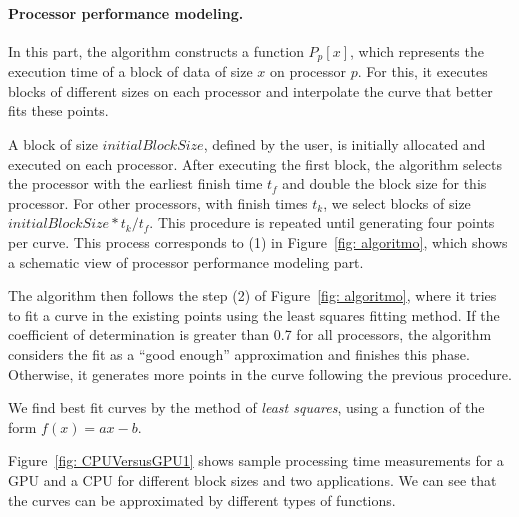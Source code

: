 \documentclass[journal]{IEEEtran}
\begin{document}
\vspace{0.2cm}
\paragraph*{Processor performance modeling.} In this part, the algorithm 
constructs a function $P_p[x]$, which represents the execution time of a block
of data of size $x$ on processor $p$. For this, it executes blocks of different
sizes on each processor and interpolate the curve that better fits these points.

A block of size $initialBlockSize$, defined by the user, is initially allocated
and executed on each processor. After executing the first block, the algorithm
selects the processor with the earliest finish time $t_f$ and double the block
size for this processor. For other processors, with finish times $t_k$, we
select blocks of size $initialBlockSize * t_k / t_f$. This procedure is repeated
until generating four points per curve. This process corresponds to (1) in
Figure~\ref{fig: algoritmo}, which shows a schematic view of processor
performance modeling part.

The algorithm then follows the step (2) of Figure~\ref{fig: algoritmo}, where it
tries to fit a curve in the existing points using the least squares fitting
method. If the coefficient of determination is greater than 0.7 for all
processors, the algorithm considers the fit as a ``good enough'' approximation and finishes this
phase. Otherwise, it generates more points in the curve following the previous
procedure.
 

We find best fit curves by the method of \textit{least squares}, using a
function of the form $f(x) = a x - b$.

Figure~\ref{fig: CPUVersusGPU1} shows sample processing time measurements for a
GPU and a CPU for different block sizes and two applications. We can see that
the curves can be approximated by different types of functions. 
\end{document}
